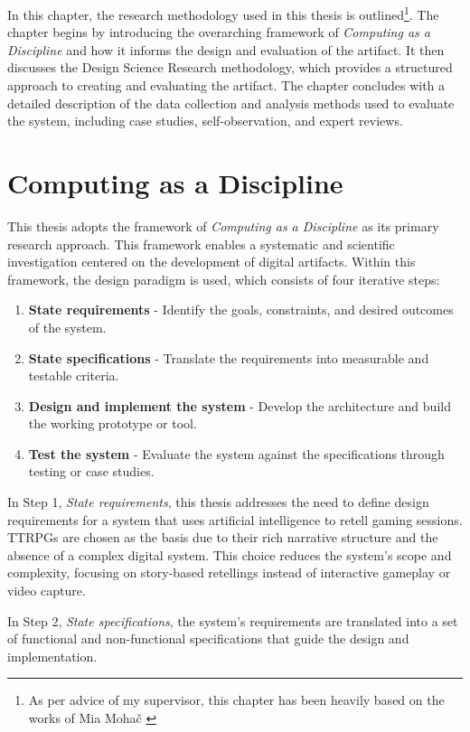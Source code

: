 \label{sec:Methods}
In this chapter, the research methodology used in this thesis is outlined\footnote{As per advice of my supervisor, this chapter has been heavily based on the works of Mia Mohač \cite{ExploringVRUI}}. The chapter begins by introducing the overarching framework of \textit{Computing as a Discipline} and how it informs the design and evaluation of the artifact. It then discusses the Design Science Research methodology, which provides a structured approach to creating and evaluating the artifact. The chapter concludes with a detailed description of the data collection and analysis methods used to evaluate the system, including case studies, self-observation, and expert reviews.

\section{Computing as a Discipline}
This thesis adopts the framework of \textit{Computing as a Discipline} \cite{denning1989computing} as its primary research approach. This framework enables a systematic and scientific investigation centered on the development of digital artifacts. Within this framework, the design paradigm is used, which consists of four iterative steps:

\begin{enumerate}
  \item \textbf{State requirements} - Identify the goals, constraints, and desired outcomes of the system.
  \item \textbf{State specifications} - Translate the requirements into measurable and testable criteria.
  \item \textbf{Design and implement the system} - Develop the architecture and build the working prototype or tool.
  \item \textbf{Test the system} - Evaluate the system against the specifications through testing or case studies.
\end{enumerate}

In Step 1, \textit{State requirements}, this thesis addresses the need to define design requirements for a system that uses artificial intelligence to retell gaming sessions. TTRPGs are chosen as the basis due to their rich narrative structure and the absence of a complex digital system. This choice reduces the system's scope and complexity, focusing on story-based retellings instead of interactive gameplay or video capture.

In Step 2, \textit{State specifications}, the system’s requirements are translated into a set of functional and non-functional specifications that guide the design and implementation.

